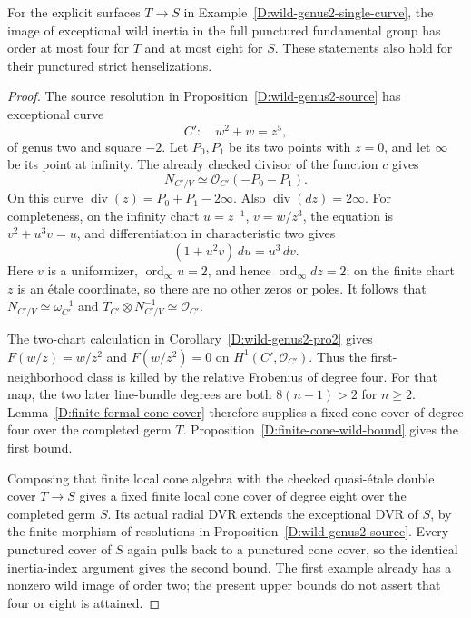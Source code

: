 \begin{corollary}
\label{D:wild-genus2-finite-inertia}
For the explicit surfaces $T\to S$ in
Example~\ref{D:wild-genus2-single-curve}, the image of
exceptional wild inertia in the full punctured
fundamental group has order at most four for $T$ and
at most eight for $S$.  These statements also hold for
their punctured strict henselizations.
\end{corollary}

\begin{proof}
The source resolution in
Proposition~\ref{D:wild-genus2-source} has exceptional curve
\[
                   C':\quad w^2+w=z^5,
\]
of genus two and square $-2$.  Let $P_0,P_1$ be its two
points with $z=0$, and let $\infty$ be its point at infinity.
The already checked divisor of the function $c$ gives
\[
                    N_{C'/V}\simeq\mathcal O_{C'}(-P_0-P_1).
\]
On this curve
$\operatorname{div}(z)=P_0+P_1-2\infty$.
Also $\operatorname{div}(dz)=2\infty$.  For completeness,
on the infinity chart $u=z^{-1}$, $v=w/z^3$, the equation
is $v^2+u^3v=u$, and differentiation in characteristic two
gives
\[
                  (1+u^2v)\,du=u^3\,dv.
\]
Here $v$ is a uniformizer, $\operatorname{ord}_\infty u=2$,
and hence $\operatorname{ord}_\infty dz=2$; on the finite
chart $z$ is an \'etale coordinate, so there are no other
zeros or poles.  It follows that
$N_{C'/V}\simeq\omega_{C'}^{-1}$ and
$T_{C'}\otimes N_{C'/V}^{-1}\simeq\mathcal O_{C'}$.

The two-chart calculation in
Corollary~\ref{D:wild-genus2-pro2} gives
$F(w/z)=w/z^2$ and $F(w/z^2)=0$ on
$H^1(C',\mathcal O_{C'})$.  Thus the first-neighborhood
class is killed by the relative Frobenius of degree four.
For that map, the two later line-bundle degrees are both
$8(n-1)>2$ for $n\geq2$.  Lemma~\ref{D:finite-formal-cone-cover}
therefore supplies a fixed cone cover of degree four
over the completed germ $T$.
Proposition~\ref{D:finite-cone-wild-bound} gives the first
bound.

Composing that finite local cone algebra with the checked
quasi-\'etale double cover $T\to S$ gives a fixed finite
local cone cover of degree eight over the completed germ
$S$.  Its actual radial DVR extends the exceptional
DVR of $S$, by the finite morphism of resolutions in
Proposition~\ref{D:wild-genus2-source}.  Every punctured
cover of $S$ again pulls back to a punctured cone cover,
so the identical inertia-index argument gives the
second bound.  The first example already has a nonzero
wild image of order two; the present upper bounds do
not assert that four or eight is attained.
\end{proof}

